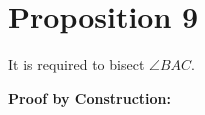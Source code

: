
\section*{Proposition 9}

\renewcommand\qedsymbol{Q.E.F}

\begin{con}
It is required to bisect $\angle{BAC}$.
\end{con}

\begin{figure}[H]
 	\caption{}
\end{figure}

\textbf{Proof by Construction:}

